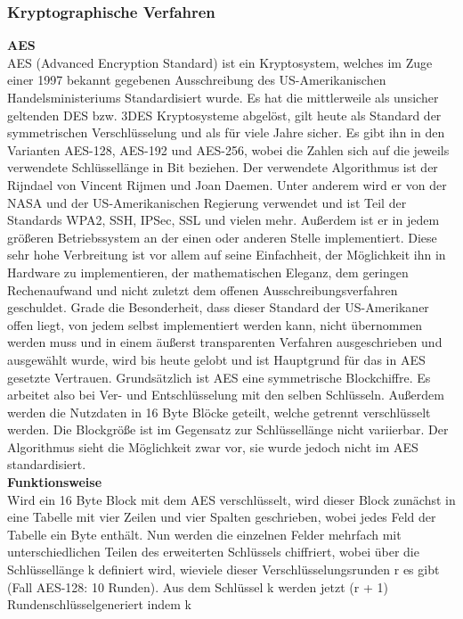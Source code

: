 \documentclass[12pt,a4paper,bibliography=totocnumbered,listof=totocnumbered]{scrartcl}
\begin{document}
\subsubsection{Kryptographische Verfahren}
\textbf{AES}\\
AES (Advanced Encryption Standard) ist ein Kryptosystem, welches im
Zuge einer 1997 bekannt gegebenen Ausschreibung des US-Amerikanischen
Handelsministeriums Standardisiert wurde. Es hat die mittlerweile als unsicher
geltenden DES bzw. 3DES Kryptosysteme abgelöst, gilt heute als Standard der
symmetrischen Verschlüsselung und als für viele Jahre sicher. Es gibt ihn in den
Varianten AES-128, AES-192 und AES-256, wobei die Zahlen sich auf die jeweils
verwendete Schlüssellänge in Bit beziehen. Der verwendete Algorithmus ist der Rijndael
von Vincent Rijmen und Joan Daemen.
Unter anderem wird er von der NASA und der US-Amerikanischen Regierung
verwendet und ist Teil der Standards WPA2, SSH, IPSec, SSL und vielen mehr.
Außerdem ist er in jedem größeren Betriebssystem an der einen oder anderen
Stelle implementiert. Diese sehr hohe Verbreitung ist vor allem auf seine
Einfachheit, der Möglichkeit ihn in Hardware zu implementieren, der
mathematischen Eleganz, dem geringen Rechenaufwand und nicht zuletzt dem offenen
Ausschreibungsverfahren geschuldet. Grade die Besonderheit, dass dieser Standard
der US-Amerikaner offen liegt, von jedem selbst implementiert werden kann, nicht
übernommen werden muss und in einem äußerst transparenten Verfahren
ausgeschrieben und ausgewählt wurde, wird bis heute gelobt und ist Hauptgrund
für das in AES gesetzte Vertrauen.
Grundsätzlich ist AES eine symmetrische Blockchiffre. Es arbeitet also bei
Ver- und Entschlüsselung mit den selben Schlüsseln. Außerdem werden die
Nutzdaten in 16 Byte Blöcke geteilt, welche getrennt verschlüsselt werden. Die
Blockgröße ist im Gegensatz zur Schlüssellänge nicht variierbar. Der Algorithmus
sieht die Möglichkeit zwar vor, sie wurde jedoch nicht im AES standardisiert.\\
\textbf{Funktionsweise}\\
Wird ein 16 Byte Block mit dem AES verschlüsselt, wird dieser Block zunächst in
eine Tabelle mit vier Zeilen und vier Spalten geschrieben, wobei jedes Feld der
Tabelle ein Byte enthält. Nun werden die einzelnen Felder mehrfach mit
unterschiedlichen Teilen des erweiterten Schlüssels chiffriert, wobei über die
Schlüssellänge k definiert wird, wieviele dieser Verschlüsselungsrunden r es
gibt (Fall AES-128: 10 Runden).
Aus dem Schlüssel k werden jetzt (r + 1) Rundenschlüsselgeneriert indem k
\end{document}
